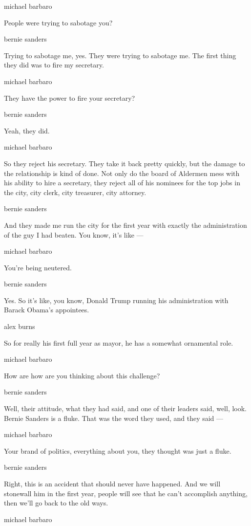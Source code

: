 michael barbaro

People were trying to sabotage you?

bernie sanders

Trying to sabotage me, yes. They were trying to sabotage me. The first
thing they did was to fire my secretary.

michael barbaro

They have the power to fire your secretary?

bernie sanders

Yeah, they did.

michael barbaro

So they reject his secretary. They take it back pretty quickly, but the
damage to the relationship is kind of done. Not only do the board of
Aldermen mess with his ability to hire a secretary, they reject all of
his nominees for the top jobs in the city, city clerk, city treasurer,
city attorney.

bernie sanders

And they made me run the city for the first year with exactly the
administration of the guy I had beaten. You know, it's like ---

michael barbaro

You're being neutered.

bernie sanders

Yes. So it's like, you know, Donald Trump running his administration
with Barack Obama's appointees.

alex burns

So for really his first full year as mayor, he has a somewhat ornamental
role.

michael barbaro

How are how are you thinking about this challenge?

bernie sanders

Well, their attitude, what they had said, and one of their leaders said,
well, look. Bernie Sanders is a fluke. That was the word they used, and
they said ---

michael barbaro

Your brand of politics, everything about you, they thought was just a
fluke.

bernie sanders

Right, this is an accident that should never have happened. And we will
stonewall him in the first year, people will see that he can't
accomplish anything, then we'll go back to the old ways.

michael barbaro

